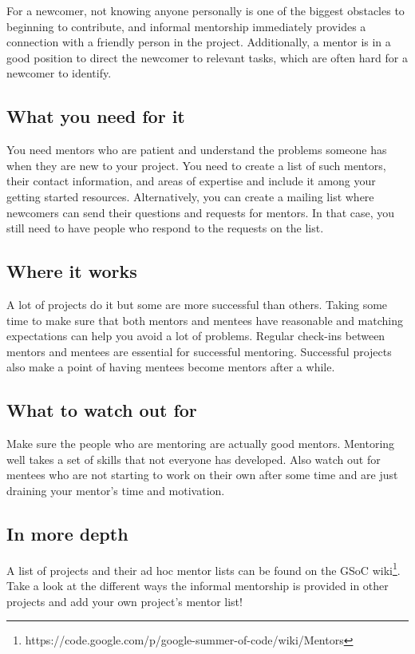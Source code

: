 For a newcomer, not knowing anyone personally is one of the biggest obstacles to beginning to contribute, and informal mentorship immediately provides a connection with a friendly person in the project. Additionally, a mentor is in a good position to direct the newcomer to relevant tasks, which are often hard for a newcomer to identify.

\subsection{What you need for it}
You need mentors who are patient and understand the problems someone has when they are new to your project. You need to create a list of such mentors, their contact information, and areas of expertise and include it among your getting started resources. Alternatively, you can create a mailing list where newcomers can send their questions and requests for mentors. In that case, you still need to have people who respond to the requests on the list.

\subsection{Where it works}
A lot of projects do it but some are more successful than others. Taking some time to make sure that both mentors and mentees have reasonable and matching expectations can help you avoid a lot of problems. Regular check-ins between mentors and mentees are essential for successful mentoring. Successful projects also make a point of having mentees become mentors after a while.

\subsection{What to watch out for}
Make sure the people who are mentoring are actually good mentors. Mentoring well takes a set of skills that not everyone has developed. Also watch out for mentees who are not starting to work on their own after some time and are just draining your mentor’s time and motivation.

\subsection{In more depth}
A list of projects and their ad hoc mentor lists can be found on the GSoC wiki\footnote{{https://code.google.com/p/google-summer-of-code/wiki/Mentors}}. Take a look at the different ways the informal mentorship is provided in other projects and add your own project’s mentor list!

